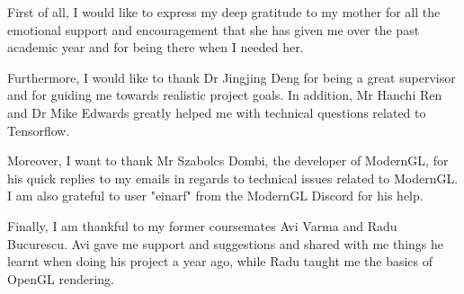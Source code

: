 \documentclass[11pt, a4paper, oneside]{custard}
\begin{document}
	\begin{Acknowledgements}
		First of all, I would like to express my deep gratitude to my mother for all the emotional support and encouragement that she has given me over the past academic year and for being there when I needed her.
		
		Furthermore, I would like to thank Dr Jingjing Deng for being a great supervisor and for guiding me towards realistic project goals. In addition, Mr Hanchi Ren and Dr Mike Edwards greatly helped me with technical questions related to Tensorflow.
		
		Moreover, I want to thank Mr Szabolcs Dombi, the developer of ModernGL, for his quick replies to my emails in regards to technical issues related to ModernGL. I am also grateful to user "einarf" from the ModernGL Discord for his help.
		
		Finally, I am thankful to my former coursemates Avi Varma and Radu Bucurescu. Avi gave me support and suggestions and shared with me things he learnt when doing his project a year ago, while Radu taught me the basics of OpenGL rendering.
	\end{Acknowledgements}
	
    \setcounter{tocdepth}{2}
	\tableofcontents
	 
	
	 
	
	\mainmatter%

	
	
	
	
 	
	
	\bibintoc%
	 
	
	\appendix
	\addappheadtotoc
	
	
\end{document}
